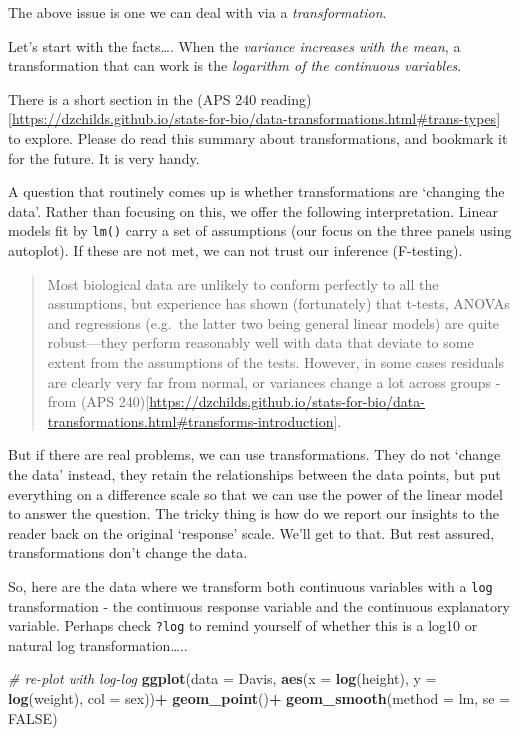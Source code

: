 \documentclass[
]{book}
\newenvironment{Shaded}{\begin{snugshade}}{\end{snugshade}}
\newcommand{\AttributeTok}[1]{\textcolor[rgb]{0.13,0.29,0.53}{#1}}
\newcommand{\CommentTok}[1]{\textcolor[rgb]{0.56,0.35,0.01}{\textit{#1}}}
\newcommand{\ConstantTok}[1]{\textcolor[rgb]{0.56,0.35,0.01}{#1}}
\newcommand{\FunctionTok}[1]{\textcolor[rgb]{0.13,0.29,0.53}{\textbf{#1}}}
\newcommand{\NormalTok}[1]{#1}
\newcommand{\SpecialCharTok}[1]{\textcolor[rgb]{0.81,0.36,0.00}{\textbf{#1}}}
\begin{document}
The above issue is one we can deal with via a \emph{transformation}.

Let's start with the facts\ldots. When the \emph{variance increases with the mean}, a transformation that can work is the \emph{logarithm of the continuous variables}.

There is a short section in the (APS 240 reading){[}\url{https://dzchilds.github.io/stats-for-bio/data-transformations.html\#trans-types}{]} to explore. Please do read this summary about transformations, and bookmark it for the future. It is very handy.

A question that routinely comes up is whether transformations are `changing the data'. Rather than focusing on this, we offer the following interpretation. Linear models fit by \texttt{lm()} carry a set of assumptions (our focus on the three panels using autoplot). If these are not met, we can not trust our inference (F-testing).

\begin{quote}
Most biological data are unlikely to conform perfectly to all the assumptions, but experience has shown (fortunately) that t-tests, ANOVAs and regressions (e.g.~the latter two being general linear models) are quite robust---they perform reasonably well with data that deviate to some extent from the assumptions of the tests. However, in some cases residuals are clearly very far from normal, or variances change a lot across groups - from (APS 240){[}\url{https://dzchilds.github.io/stats-for-bio/data-transformations.html\#transforms-introduction}{]}.
\end{quote}

But if there are real problems, we can use transformations. They do not `change the data' instead, they retain the relationships between the data points, but put everything on a difference scale so that we can use the power of the linear model to answer the question. The tricky thing is how do we report our insights to the reader back on the original `response' scale. We'll get to that. But rest assured, transformations don't change the data.

So, here are the data where we transform both continuous variables with a \texttt{log} transformation - the continuous response variable and the continuous explanatory variable. Perhaps check \texttt{?log} to remind yourself of whether this is a log10 or natural log transformation\ldots..

\begin{Shaded}
\begin{Highlighting}[]
\CommentTok{\# re{-}plot with log{-}log}
\FunctionTok{ggplot}\NormalTok{(}\AttributeTok{data =}\NormalTok{ Davis, }\FunctionTok{aes}\NormalTok{(}\AttributeTok{x =} \FunctionTok{log}\NormalTok{(height), }\AttributeTok{y =} \FunctionTok{log}\NormalTok{(weight), }\AttributeTok{col =}\NormalTok{ sex))}\SpecialCharTok{+}
  \FunctionTok{geom\_point}\NormalTok{()}\SpecialCharTok{+}
  \FunctionTok{geom\_smooth}\NormalTok{(}\AttributeTok{method =}\NormalTok{ lm, }\AttributeTok{se =} \ConstantTok{FALSE}\NormalTok{)}
\end{Highlighting}
\end{Shaded}
\end{document}
